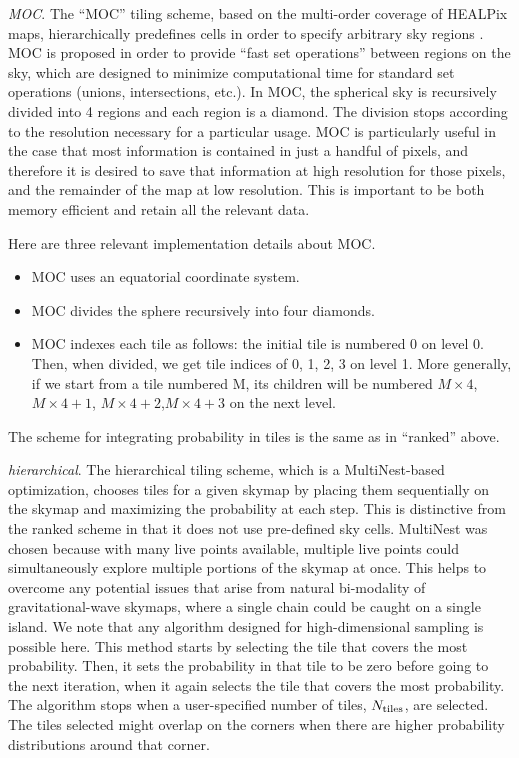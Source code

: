\documentclass[twocolumn]{aastex62}
\begin{document}
\emph{MOC}. The ``MOC'' tiling scheme, based on the multi-order coverage of HEALPix maps, hierarchically predefines cells in order to specify arbitrary sky regions \citep{FeBo2014}. 
MOC is proposed in order to provide ``fast set operations'' between regions on the sky, which are designed to minimize computational time for standard set operations (unions, intersections, etc.). In MOC, the spherical sky is recursively divided into 4 regions and each region is a diamond. 
The division stops according to the resolution necessary for a particular usage.
MOC is particularly useful in the case that most information is contained in just a handful of pixels, and therefore it is desired to save that information at high resolution for those pixels, and the remainder of the map at low resolution.
This is important to be both memory efficient and retain all the relevant data.

Here are three relevant implementation details about MOC.
\begin{itemize}
\item MOC uses an equatorial coordinate system. 
\item MOC divides the sphere recursively into four diamonds. 
\item MOC indexes each tile as follows: the initial tile is numbered 0 on level 0. Then, when divided, we get tile indices of 0, 1, 2, 3 on level 1. More generally, if we start from a tile numbered M, its children will be numbered $M\times 4$, $M\times 4 + 1$, $M\times 4 + 2$,$M\times 4 + 3$ on the next level.
\end{itemize}

The scheme for integrating probability in tiles is the same as in ``ranked'' above.

\emph{hierarchical}. The hierarchical tiling scheme, which is a MultiNest-based \citep{FeHo2009,FeGa2009,BuGe2014} optimization, chooses tiles for a given skymap by placing them sequentially on the skymap and maximizing the probability at each step. 
This is distinctive from the ranked scheme in that it does not use pre-defined sky cells.
MultiNest was chosen because with many live points available, multiple live points could simultaneously explore multiple portions of the skymap at once. 
This helps to overcome any potential issues that arise from natural bi-modality of gravitational-wave skymaps, where a single chain could be caught on a single island.
We note that any algorithm designed for high-dimensional sampling is possible here. This method starts by selecting the tile that covers the most probability. Then, it sets the probability in that tile to be zero before going to the next iteration, when it again selects the tile that covers the most probability. The algorithm stops when a user-specified number of tiles, $N_{\rm tiles}$, are selected. The tiles selected might overlap on the corners when there are higher probability distributions around that corner. 
 
\end{document}

